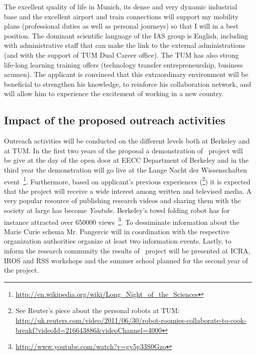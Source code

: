 The excellent  quality of life in  Munich, its
dense and very  dynamic industrial base and the  excellent airport and
train connections will support  my mobility plans (professional duties
as well as  personal journeys) so that I will in  a best position. The
dominant scientific  language of the IAS group  is English, including
with  administrative staff  that can  make  the link  to the  external
administrations (and with the support  of TUM Dual Career office). The
TUM  has also  strong life-long  learning training  offers (technology
transfer entrepreneurship, business acumen).   The applicant is convinced that this
extraordinary  environment   will  be  beneficial   to  strengthen  his
knowledge, to reinforce his collaboration network, and will allow him to
experience the excitement of working in a new country.
\subsection{Impact of the proposed outreach activities}
Outreach activities will be conducted on the different levels both at Berkeley
and at TUM. In the first two years of the proposal a demonstration of \ksem\
project will be give at the day of the open door at EECC Department of Berkeley and
in the third year the demonstration will go live at the Lange Nacht der Wissenschaften
event~\footnote{\url{http://en.wikipedia.org/wiki/Long_Night_of_the_Sciences}}.
Furthermore, based on applicant's previous experiences (\footnote{See Reuter's piece about
the personal robots at TUM: 
\url{http://uk.reuters.com/video/2011/06/30/robot-roomies-collaborate-to-cook-breakf?videoId=216643886&videoChannel=4000}}) 
it is expected that the project will receive a wide interest among written and televised media.
A very popular resource of publishing research videos and sharing them with the society at large
has become \emph{Youtube}. Berkeley's towel folding robot has for instance attracted over 650000 
views~\footnote{\url{http://www.youtube.com/watch?v=gy5g33S0Gzo}}. To dessiminate information about
the Marie Curie schema Mr. Pangercic will in coordination with the respective organization authorities
organize at least two information events. Lastly, to inform the research community the results of 
\ksem\ project will be presented at ICRA, IROS and RSS workshops and the summer school planned for
the second year of the project.
 
